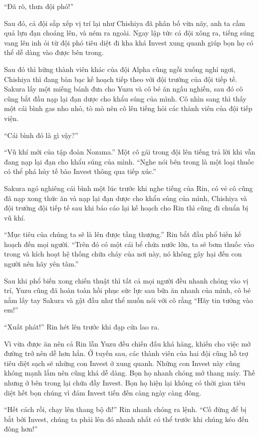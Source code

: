 {``Đã rõ, thưa đội phó!''

Sau đó, cả đội sắp xếp vị trí lại như Chishiya đã phân bố vừa nãy, anh
ta cầm quả lựu đạn choáng lên, và ném ra ngoài. Ngay lập tức cả đội xông
ra, tiếng súng vang lên inh ỏi từ đội phó tiêu diệt đi kha khá Invest
xung quanh giúp bọn họ có thể dễ dàng vào được bên trong.

Sau đó thì hững thành viên khác của đội Alpha cũng ngồi xuống nghỉ ngơi,
Chishiya thì đang bàn bạc kế hoạch tiếp theo với đội trưởng của đội tiếp
tế. Sakura lấy một miếng bánh đưa cho Yuzu và cô bé ăn ngấu nghiến, sau
đó cô cũng bắt đầu nạp lại đạn dược cho khẩu súng của mình. Cô nhìn sang
thì thấy một cái bình gas nho nhỏ, tò mò nên cô lên tiếng hỏi các thành
viên của đội tiếp viện.

``Cái bình đó là gì vậy?''

``Vũ khí mới của tập đoàn Nozama.'' Một cô gái trong đội lên tiếng trả
lời khi vẫn đang nạp lại đạn cho khẩu súng của mình. ``Nghe nói bên
trong là một loại thuốc có thể phá hủy tế bào Invest thông qua tiếp
xúc.''

Sakura ngó nghiêng cái bình một lúc trước khi nghe tiếng của Rin, có vẻ
cô cũng đã nạp xong thức ăn và nạp lại đạn dược cho khẩu súng của mình,
Chishiya và đội trưởng đội tiếp tế sau khi báo cáo lại kế hoạch cho Rin
thì cũng đi chuẩn bị vũ khí.

``Mục tiêu của chúng ta sẽ là lên được tầng thượng.'' Rin bắt đầu phổ
biến kế hoạch đến mọi người. ``Trên đó có một cái bể chứa nước lớn, ta
sẽ bơm thuốc vào trong và kích hoạt hệ thống chữa cháy của nơi này, nó
không gây hại đến con người nên hãy yên tâm.''

Sau khi phổ biến xong chiến thuật thì tất cả mọi người đều nhanh chóng
vào vị trí, Yuzu cũng đã hoàn toàn hồi phục sức lực sau bữa ăn nhanh của
mình, cô bé nắm lấy tay Sakura và gật đầu như thể muốn nói với cô rằng
``Hãy tin tưởng vào em!''

``Xuất phát!'' Rin hét lên trước khi đạp cửa lao ra.

Vì vừa được ăn nên cả Rin lẫn Yuzu đều chiến đấu khá hăng, khiến cho
việc mở đường trở nên dễ hơn hẳn. Ở tuyến sau, các thành viên của hai
đội cũng hỗ trợ tiêu diệt sạch sẽ những con Invest ở xung quanh. Những
con Invest này cũng không mạnh lắm nên cũng khá dễ dàng. Bọn họ nhanh
chóng mở thang máy. Thế nhưng ở bên trong lại chứa đầy Invest. Bọn họ
hiện lại không có thời gian tiêu diệt hết bọn chúng vì đám Invest tiến
đến càng ngày càng đông.

``Hết cách rồi, chạy lên thang bộ đi!'' Rin nhanh chóng ra lệnh. ``Cố
đừng để bị bắt bởi Invest, chúng ta phải lên đó nhanh nhất có thể trước
khi chúng kéo đến đông hơn!''

}
